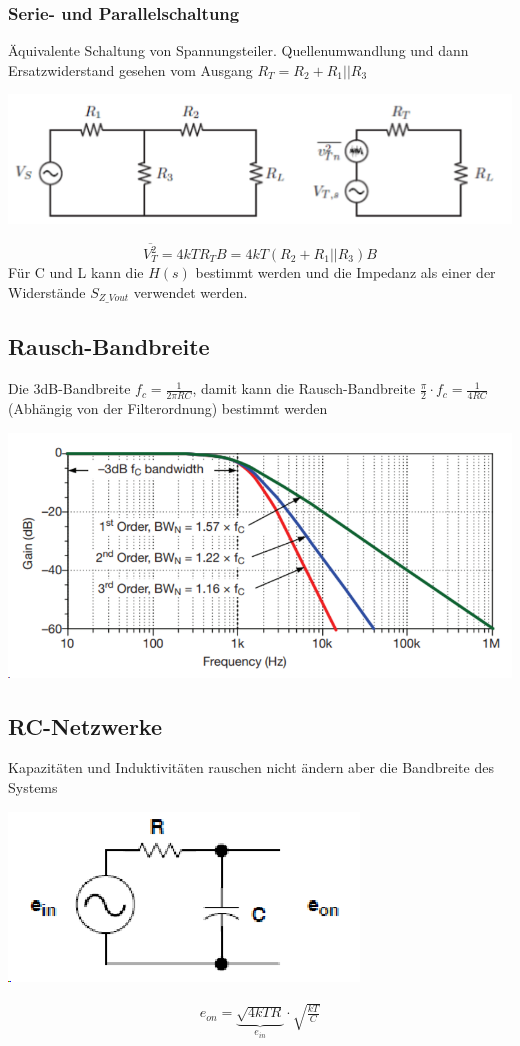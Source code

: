 \subsubsection{Serie- und Parallelschaltung}
Äquivalente Schaltung von Spannungsteiler. Quellenumwandlung und dann Ersatzwiderstand gesehen vom Ausgang $R_T = R_2 + R_1||R_3$
\begin{center}
	\includegraphics[width=0.6\columnwidth]{Images/rauschen_serie_parallel}
\end{center}
\[
\overline{V_T^2} = 4kTR_TB = 4kT(R_2 + R_1||R_3)B
\]
Für C und L kann die $H(s)$ bestimmt werden und die Impedanz als einer der Widerstände $S_{Z\_Vout}$ verwendet werden.

\subsection{Rausch-Bandbreite}
Die 3dB-Bandbreite $f_c = \frac{1}{2\pi RC}$, damit kann die Rausch-Bandbreite $\frac{\pi}{2}\cdot f_c = \frac{1}{4RC}$ (Abhängig von der Filterordnung) bestimmt werden
\begin{center}
	\includegraphics[width=\columnwidth]{Images/rauschen_bandbreite}
\end{center}

\subsection{RC-Netzwerke}
Kapazitäten und Induktivitäten rauschen nicht ändern aber die Bandbreite des Systems

\begin{center}
	\includegraphics[width=0.5\columnwidth]{Images/rc}
\end{center}
\begin{align*}
e_{on} = \underbrace{\sqrt{4kTR}}_{e_{in}}\cdot \sqrt{\frac{kT}{C}}
\end{align*}

